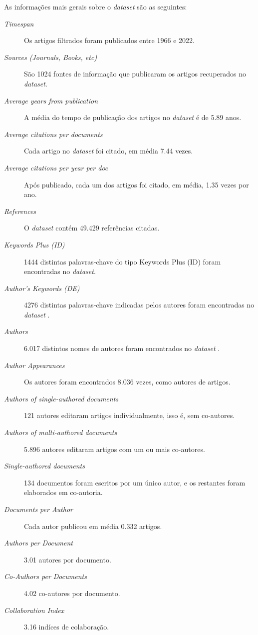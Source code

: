 As informações mais gerais sobre o \textit{dataset} são as seguintes:
\begin{description}
    \item [\textit{Timespan}] Os artigos filtrados foram publicados entre 1966 e 2022.
    \item [\textit{Sources (Journals, Books, etc)}] São 1024 fontes de informação que publicaram os artigos recuperados no \textit{dataset}.
    \item [\textit{Average years from publication}] A média do tempo de publicação dos artigos no \textit{dataset} é de 5.89 anos.
    \item [\textit{Average citations per documents}] Cada artigo no \textit{dataset} foi citado, em média 7.44 vezes.
    \item [\textit{Average citations per year per doc}] Após publicado, cada um dos artigos foi citado, em média, 1.35 vezes por ano.
    \item [\textit{References}] O \textit{dataset} contém 49.429 referências citadas.
    \item [\textit{Keywords Plus (ID)}] 1444 distintas palavras-chave do tipo Keywords Plus (ID) foram encontradas no \textit{dataset}.
    \item [\textit{Author's Keywords (DE)}] 4276 distintas palavras-chave indicadas pelos autores foram encontradas no \textit{dataset} .
    \item [\textit{Authors}] 6.017 distintos nomes de autores foram encontrados no \textit{dataset} .
    \item [\textit{Author Appearances}] Os autores foram encontrados 8.036 vezes, como autores de artigos.
    \item [\textit{Authors of single-authored documents}] 121 autores editaram artigos individualmente, isso é, sem co-autores.
    \item [\textit{Authors of multi-authored documents}] 5.896 autores editaram artigos com um ou mais co-autores.
    \item [\textit{Single-authored documents}] 134 documentos foram escritos por um único autor, e os restantes foram elaborados em co-autoria.
    \item [\textit{Documents per Author}] Cada autor publicou em média 0.332 artigos.
    \item [\textit{Authors per Document}] 3.01 autores por documento.
    \item [\textit{Co-Authors per Documents}] 4.02 co-autores por documento.
    \item [\textit{Collaboration Index}] 3.16 indíces de colaboração.
\end{description}

